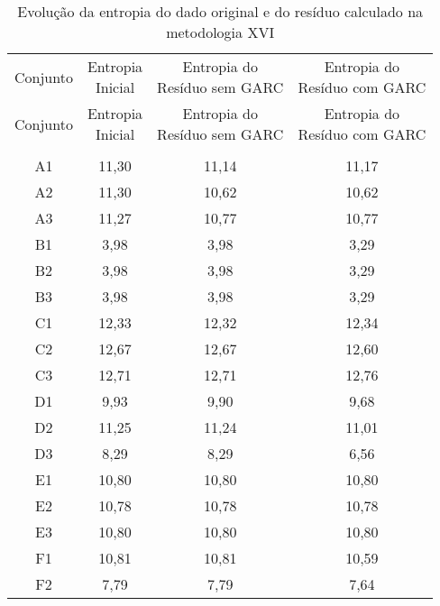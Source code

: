 \begin{center}
\begin{longtable}{cccc}
\toprule
\rowcolor{white}
\caption[Metodologia XVI: evolução da entropia]{Evolução da entropia do dado
original e do resíduo calculado na metodologia XVI}
\label{tab:EvolucaoEntropiaMet16}\\
\midrule
Conjunto & \specialcell{Entropia \\Inicial} & \specialcell{Entropia do
\\Resíduo sem GARC} & \specialcell{Entropia do
\\Resíduo com GARC}  \\
\midrule
\endfirsthead
\midrule
\rowcolor{white}
Conjunto & \specialcell{Entropia \\Inicial} & \specialcell{Entropia do
\\Resíduo sem GARC} & \specialcell{Entropia do
\\Resíduo com GARC}  \\
\toprule
\endhead
\midrule \\ %
\endfoot
\bottomrule 
\endlastfoot
    A1    & 11,30 & 11,14 & 11,17 \\
    A2    & 11,30 & 10,62 & 10,62 \\
    A3    & 11,27 & 10,77 & 10,77 \\
    B1    & 3,98  & 3,98  & 3,29 \\
    B2    & 3,98  & 3,98  & 3,29 \\
    B3    & 3,98  & 3,98  & 3,29 \\
    C1    & 12,33 & 12,32 & 12,34 \\
    C2    & 12,67 & 12,67 & 12,60 \\
    C3    & 12,71 & 12,71 & 12,76 \\
    D1    & 9,93  & 9,90  & 9,68 \\
    D2    & 11,25 & 11,24 & 11,01 \\
    D3    & 8,29  & 8,29  & 6,56 \\
    E1    & 10,80 & 10,80 & 10,80 \\
    E2    & 10,78 & 10,78 & 10,78 \\
    E3    & 10,80 & 10,80 & 10,80 \\
    F1    & 10,81 & 10,81 & 10,59 \\
    F2    & 7,79  & 7,79  & 7,64 \\

\end{longtable}
\end{center}
